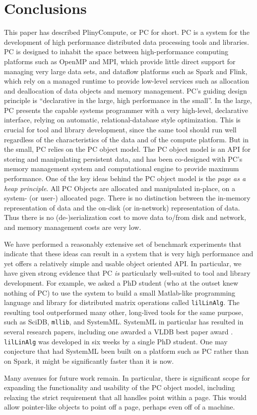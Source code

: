 
\section{Conclusions}

This paper has described PlinyCompute, or PC for short.  PC is a system for the development of high performance
distributed data processing tools and libraries.  PC is designed to inhabit the space between
high-performance computing platforms such as OpenMP and MPI, which provide little direct support
for managing very large data sets, and dataflow platforms such as Spark and Flink, which rely on 
a managed runtime to provide low-level services such as allocation and deallocation of data objects and memory management.
PC's guiding design principle is ``declarative in the large,
high performance in the small''.
In the large, PC presents the capable systems programmer with a very high-level, declarative interface, relying on automatic,
relational-database style optimization.  This is crucial for tool and library development, since the same tool should run well
regardless of the characteristics of the data and of the compute platform.  But in the small, PC relies on the PC object model.
The PC object model is an
API for storing and manipulating persistent data, and has been co-designed with PC’s memory management
system and computational engine to provide maximum performance.
One of the key ideas behind the PC object model is the \emph{page as a heap principle}. All PC
Objects are allocated and manipulated in-place, on a system- (or user-) allocated page. There is no distinction
between the in-memory representation of data and the on-disk (or in-network) representation of data.
Thus there is no (de-)serialization cost to move data to/from disk and network, and memory management
costs are very low.

We have performed a reasonably extensive set of benchmark experiments that indicate that these ideas can result in 
a system that is very high performance and yet offers a relatively simple and usable object oriented API.  In particular, 
we have given strong evidence that PC \emph{is} particularly well-suited to tool and library development. 
For example, we asked a PhD
student (who at the outset knew nothing of PC) to use the system to build a small Matlab-like programming
language and library for distributed matrix operations called
\texttt{lilLinAlg}.  The resulting tool outperformed many other, long-lived tools
for the same purpose, such as SciDB, \texttt{mllib}, and SystemML.  SystemML in particular has resulted 
in several research papers,
including one awarded a VLDB best paper award \cite{boehm2016systemml}.
\texttt{lilLinAlg} was developed in six weeks by a single PhD student.
One may conjecture that had SystemML been built on a platform such as PC rather than on Spark, it might be significantly
faster than it is now.

Many avenues for future work remain.  In particular, there is significant scope for expanding the functionality and
usability of the PC object model, including relaxing the strict requirement that all handles point within a page.  This
would allow pointer-like objects to point off a page, perhaps even off of a machine.  
